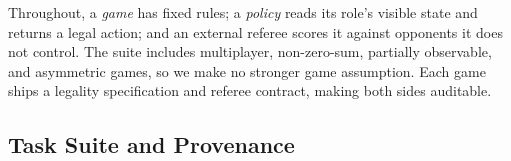 %
%
%
Throughout, a \emph{game} has fixed rules; a \emph{policy} reads its role's visible
state and returns a legal action; and an external referee scores it against opponents
it does not control. The suite includes multiplayer, non-zero-sum, partially observable,
and asymmetric games, so we make no stronger game assumption. Each game ships a
legality specification and referee contract, making both sides auditable.

\subsection{Task Suite and Provenance}
\label{sec:arena-provenance}

